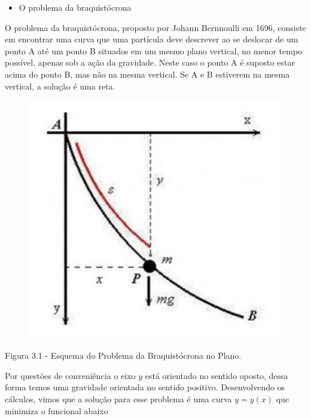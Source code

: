 \documentclass[12pt, a4paper]{article}
\begin{document}
\begin{itemize}
\item O problema da braquistócrona
\end{itemize}

O problema da braquistócrona, proposto por Johann Bernnoulli em 1696, consiste em encontrar uma curva que uma partícula deve descrever ao se deslocar de um ponto A até um ponto B situados em um mesmo plano vertical, no menor tempo possível, apenas sob a ação da gravidade. Neste caso o ponto A é suposto estar acima do ponto B, mas não na mesma vertical. Se A e B estiverem na mesma vertical, a solução é uma reta.


\begin{center}
\begin{figure}[!h]
	\centering
    \includegraphics[scale=0.6]{imgs/braquistocrona.png}

  \end{figure}

Figura 3.1 - Esquema do Problema da Braquistócrona no Plano.

\end{center}

Por questões de conveniência o eixo $y$ está orientado no sentido oposto, dessa forma temos uma gravidade orientada no sentido positivo. Desenvolvendo os cálculos, vimos que a solução para esse problema é uma curva $y=y(x)$ que minimiza o funcional abaixo
\end{document}
